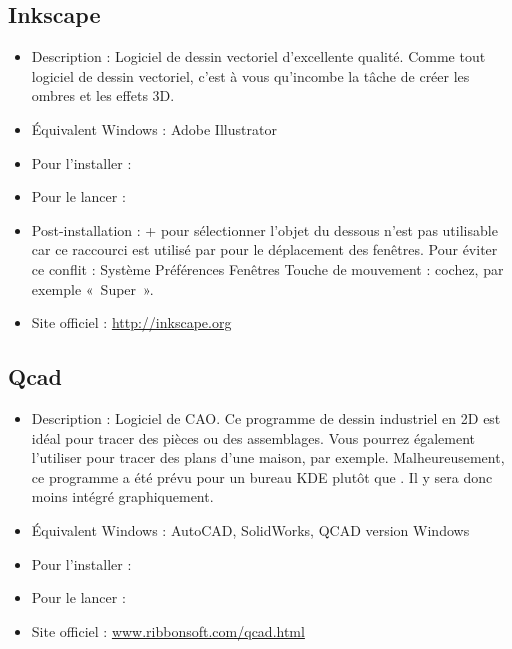 \subsection{Inkscape}
\begin{itemize}
\begingroup
{}
\item Description : Logiciel de dessin vectoriel d'excellente qualité. Comme tout logiciel de dessin vectoriel, c'est à vous qu'incombe la tâche de créer les ombres et les effets 3D.{\par}
\item Équivalent Windows : Adobe Illustrator{\par}
\endgroup
\item Pour l'installer : 
\item Pour le lancer : 
\item Post-installation :  +  pour sélectionner l'objet du dessous n'est pas utilisable car ce raccourci est utilisé par  pour le déplacement des fenêtres. Pour éviter ce conflit : Système \FlecheDroite Préférences \FlecheDroite Fenêtres \FlecheDroite Touche de mouvement : cochez, par exemple «~Super~».{\par}
\item Site officiel : \url{http://inkscape.org}{\par}
\end{itemize}
\subsection{Qcad}
\begin{itemize}
\begingroup
{}
\item Description : Logiciel de CAO. Ce programme de dessin industriel en 2D est idéal pour tracer des pièces ou des assemblages. Vous pourrez également l'utiliser pour tracer des plans d'une maison, par exemple. Malheureusement, ce programme a été prévu pour un bureau KDE plutôt que . Il y sera donc moins intégré graphiquement.{\par}
\endgroup
\item Équivalent Windows : AutoCAD, SolidWorks, QCAD version Windows
\item Pour l'installer : 
\item Pour le lancer : 
\item Site officiel : \url{www.ribbonsoft.com/qcad.html}{\par}
\end{itemize}
\newpage
